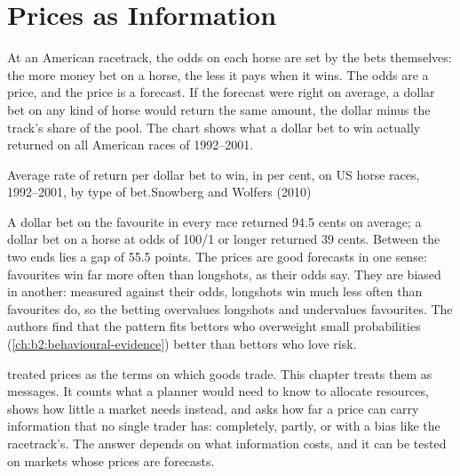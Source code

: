 \chapter{Prices as Information}\label{ch:b2:prices-as-information}

At an American racetrack, the odds on each horse are set by the bets themselves: the more money bet on
a horse, the less it pays when it wins. The odds are a price, and the price is a forecast. If the
forecast were right on average, a dollar bet on any kind of horse would return the same amount, the
dollar minus the track's share of the pool. The chart shows what a dollar bet to win actually returned
on all American races of 1992--2001.

\begin{openingchart}{Average rate of return per dollar bet to win, in per cent, on US horse races,
  1992--2001, by type of bet.}{Snowberg and Wolfers (2010)}
\end{openingchart}

A dollar bet on the favourite in every race returned 94.5 cents on average; a dollar bet on a horse at
odds of 100/1 or longer returned 39 cents. Between the two ends lies a gap of 55.5 points. The prices
are good forecasts in one sense: favourites win far more often than longshots, as their odds say. They
are biased in another: measured against their odds, longshots win much less often than favourites do, so
the betting overvalues longshots and undervalues favourites. The
authors find that the pattern fits bettors who overweight small probabilities
(\cref{ch:b2:behavioural-evidence}) better than bettors who love risk.

 treated prices as the terms on which goods
trade. This chapter treats them as messages. It counts what a planner would need to know to allocate
resources, shows how little a market needs instead, and asks how far a price can carry information
that no single trader has: completely, partly, or with a bias like the racetrack's. The answer depends
on what information costs, and it can be tested on markets whose prices are forecasts.

